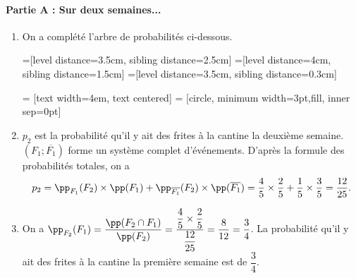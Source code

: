 \documentclass[11pt,fleqn, openany]{book} %
\begin{document}
\begin{solution}\hspace{0pt}

\paragraph{Partie A : Sur deux semaines...}


\begin{enumerate}
    \item On a complété l'arbre de probabilités ci-dessous.
    
    =[level distance=3.5cm, sibling distance=2.5cm]
=[level distance=4cm, sibling distance=1.5cm]
=[level distance=3.5cm, sibling distance=0.3cm]

 = [text width=4em, text centered]
 = [circle, minimum width=3pt,fill, inner sep=0pt]


\begin{center}
\end{center}
    
    \item $p_2$ est la probabilité qu'il y ait des frites à la cantine la deuxième semaine. $(F_1 ; \overline{F_1})$ forme un système complet d'événements. D'après la formule des probabilités totales, on a
    \[p_2= \pp _{F_1}(F_2) \times \pp (F_1) + \pp _{\overline{F_1}}(F_2) \times \pp (\overline{F_1}) = \dfrac{4}{5} \times \dfrac{2}{5} + \dfrac{1}{5} \times \dfrac{3}{5}=\dfrac{12}{25}.\] 
    \item On a $\pp _{F_2}(F_1)=\dfrac{\pp(F_2 \cap F_1)}{\pp(F_2)}=\dfrac{\dfrac{4}{5} \times \dfrac{2}{5}}{\dfrac{12}{25}}=\dfrac{8}{12}=\dfrac{3}{4}$.
    La probabilité qu'il y ait des frites à la cantine la première semaine est de $\dfrac{3}{4}$.
\end{enumerate} 



\end{solution}
\end{document}
